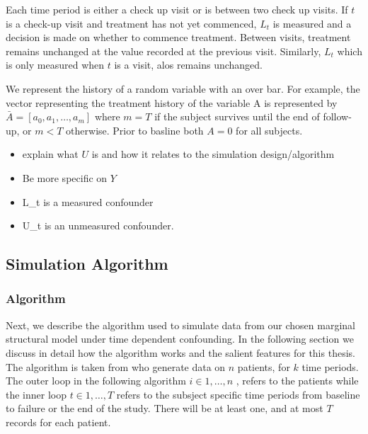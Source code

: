 \documentclass[11pt]{article}
\providecommand{\tightlist}{%
      \setlength{\itemsep}{0pt}\setlength{\parskip}{0pt}}
\begin{document}
Each time period is either a check up visit or is between two check up
visits. If \(t\) is a check-up visit and treatment has not yet
commenced, \(L_t\) is measured and a decision is made on whether to
commence treatment. Between visits, treatment remains unchanged at the
value recorded at the previous visit. Similarly, \(L_t\) which is only
measured when \(t\) is a visit, alos remains unchanged.

We represent the history of a random variable with an over bar. For
example, the vector representing the treatment history of the variable A
is represented by \(\bar A = [a_0, a_1, \dots, a_m]\) where \(m=T\) if
the subject survives until the end of follow-up, or \(m < T\) otherwise.
Prior to basline both \(A = 0\) for all subjects.

\begin{itemize}
\tightlist
\item
  explain what \(U\) is and how it relates to the simulation
  design/algorithm
\item
  Be more specific on \(Y\)
\item
  L\_t is a measured confounder
\item
  U\_t is an unmeasured confounder.
\end{itemize}

\subsection{Simulation Algorithm}\label{simulation-algorithm}

\subsubsection{Algorithm}\label{algorithm}

Next, we describe the algorithm used to simulate data from our chosen
marginal structural model under time dependent confounding. In the
following section we discuss in detail how the algorithm works and the
salient features for this thesis. The algorithm is taken from
\citet{Havercroft2012} who generate data on \(n\) patients, for \(k\)
time periods. The outer loop in the following algorithm
\(i \in {1, \dots, n}\) , refers to the patients while the inner loop
\(t \in {1, \dots, T}\) refers to the subsject specific time periods
from baseline to failure or the end of the study. There will be at least
one, and at most \(T\) records for each patient.
\end{document}
